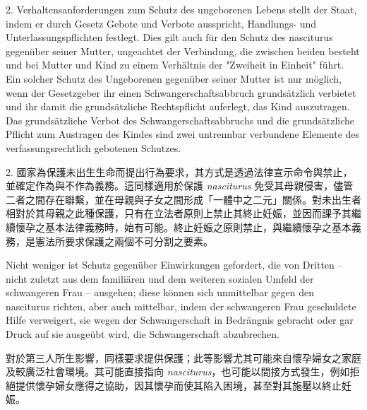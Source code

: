 \documentclass[12pt]{article}
\begin{document}
\begin{sourcepara}[title={原文D.40}]
2. Verhaltensanforderungen zum Schutz des ungeborenen Lebens stellt der Staat, indem er durch Gesetz Gebote und Verbote ausspricht, Handlungs- und Unterlassungspflichten festlegt. Dies gilt auch für den Schutz des nasciturus gegenüber seiner Mutter, ungeachtet der Verbindung, die zwischen beiden besteht und bei Mutter und Kind zu einem Verhältnis der "Zweiheit in Einheit" führt. Ein solcher Schutz des Ungeborenen gegenüber seiner Mutter ist nur möglich, wenn der Gesetzgeber ihr einen Schwangerschaftsabbruch grundsätzlich verbietet und ihr damit die grundsätzliche Rechtspflicht auferlegt, das Kind auszutragen. Das grundsätzliche Verbot des Schwangerschaftsabbruchs und die grundsätzliche Pflicht zum Austragen des Kindes sind zwei untrennbar verbundene Elemente des verfassungsrechtlich gebotenen Schutzes.
\end{sourcepara}
\begin{transpara}
2. 國家為保護未出生生命而提出行為要求，其方式是透過法律宣示命令與禁止，並確定作為與不作為義務。這同樣適用於保護 \textit{nasciturus} 免受其母親侵害，儘管二者之間存在聯繫，並在母親與子女之間形成「一體中之二元」關係。對未出生者相對於其母親之此種保護，只有在立法者原則上禁止其終止妊娠，並因而課予其繼續懷孕之基本法律義務時，始有可能。終止妊娠之原則禁止，與繼續懷孕之基本義務，是憲法所要求保護之兩個不可分割之要素。
\end{transpara}

\begin{sourcepara}[title={原文D.41}]
Nicht weniger ist Schutz gegenüber Einwirkungen gefordert, die von Dritten -- nicht zuletzt aus dem familiären und dem weiteren sozialen Umfeld der schwangeren Frau -- ausgehen; diese können sich unmittelbar gegen den nasciturus richten, aber auch mittelbar, indem der schwangeren Frau geschuldete Hilfe verweigert, sie wegen der Schwangerschaft in Bedrängnis gebracht oder gar Druck auf sie ausgeübt wird, die Schwangerschaft abzubrechen.
\end{sourcepara}
\begin{transpara}
對於第三人所生影響，同樣要求提供保護；此等影響尤其可能來自懷孕婦女之家庭及較廣泛社會環境。其可能直接指向 \textit{nasciturus}，也可能以間接方式發生，例如拒絕提供懷孕婦女應得之協助，因其懷孕而使其陷入困境，甚至對其施壓以終止妊娠。
\end{transpara}
\end{document}

